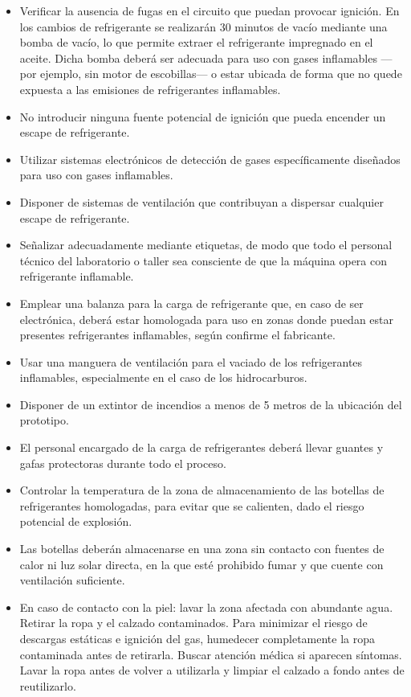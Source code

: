 \documentclass[../main.tex]{subfiles}
\begin{document}
\begin{itemize}
    \item Verificar la ausencia de fugas en el circuito que puedan provocar ignición. En los cambios de refrigerante se realizarán 30 minutos de vacío mediante una bomba de vacío, lo que permite extraer el refrigerante impregnado en el aceite. Dicha bomba deberá ser adecuada para uso con gases inflamables —por ejemplo, sin motor de escobillas— o estar ubicada de forma que no quede expuesta a las emisiones de refrigerantes inflamables.
    \item No introducir ninguna fuente potencial de ignición que pueda encender un escape de refrigerante.
    \item Utilizar sistemas electrónicos de detección de gases específicamente diseñados para uso con gases inflamables.
    \item Disponer de sistemas de ventilación que contribuyan a dispersar cualquier escape de refrigerante.
    \item Señalizar adecuadamente mediante etiquetas, de modo que todo el personal técnico del laboratorio o taller sea consciente de que la máquina opera con refrigerante inflamable.
    \item Emplear una balanza para la carga de refrigerante que, en caso de ser electrónica, deberá estar homologada para uso en zonas donde puedan estar presentes refrigerantes inflamables, según confirme el fabricante.
    \item Usar una manguera de ventilación para el vaciado de los refrigerantes inflamables, especialmente en el caso de los hidrocarburos.
    \item Disponer de un extintor de incendios a menos de 5 metros de la ubicación del prototipo.
    \item El personal encargado de la carga de refrigerantes deberá llevar guantes y gafas protectoras durante todo el proceso.
    \item Controlar la temperatura de la zona de almacenamiento de las botellas de refrigerantes homologadas, para evitar que se calienten, dado el riesgo potencial de explosión.
    \item Las botellas deberán almacenarse en una zona sin contacto con fuentes de calor ni luz solar directa, en la que esté prohibido fumar y que cuente con ventilación suficiente.
    \item En caso de contacto con la piel: lavar la zona afectada con abundante agua. Retirar la ropa y el calzado contaminados. Para minimizar el riesgo de descargas estáticas e ignición del gas, humedecer completamente la ropa contaminada antes de retirarla. Buscar atención médica si aparecen síntomas. Lavar la ropa antes de volver a utilizarla y limpiar el calzado a fondo antes de reutilizarlo.

\end{itemize}
\end{document}
